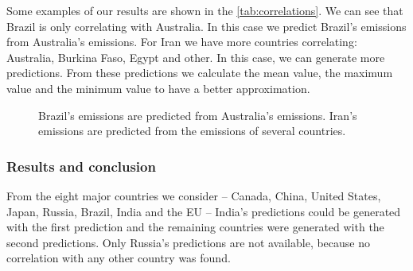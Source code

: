 Some examples of our results are shown in the \autoref{tab:correlations}. We can see that Brazil is only correlating with Australia. In this case we predict Brazil's emissions from Australia's emissions. For Iran we have more countries correlating: Australia, Burkina Faso, Egypt and other. In this case, we can generate more predictions. From these predictions we calculate the mean value, the maximum value and the minimum value to have a better approximation.
\begin{figure}[h!]
	\centering
	\caption{Brazil's emissions are predicted from Australia's emissions. Iran's emissions are predicted from the emissions of several countries.}
	\label{fig:resultsExample} %
\end{figure}

\subsubsection{Results and conclusion}
From the eight major countries we consider -- Canada, China, United States, Japan, Russia, Brazil, India and the EU -- India's predictions could be generated with the first prediction and the remaining countries were generated with the second predictions.
Only Russia's predictions are not available, because no correlation with any other country was found.

